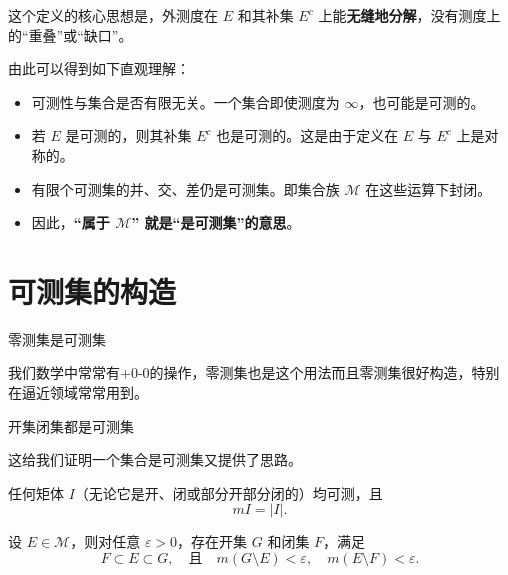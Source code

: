 \documentclass[lang=cn,10pt]{elegantbook}
\begin{document}
这个定义的核心思想是，外测度在 $E$ 和其补集 $E^c$ 上能\textbf{无缝地分解}，没有测度上的“重叠”或“缺口”。

由此可以得到如下直观理解：
\begin{itemize}
  \item 可测性与集合是否有限无关。一个集合即使测度为 $\infty$，也可能是可测的。
  \item 若 $E$ 是可测的，则其补集 $E^c$ 也是可测的。这是由于定义在 $E$ 与 $E^c$ 上是对称的。
  \item 有限个可测集的并、交、差仍是可测集。即集合族 $\mathcal{M}$ 在这些运算下封闭。
  \item 因此，\textbf{“属于 $\mathcal{M}$” 就是“是可测集”的意思}。
\end{itemize}
\section{可测集的构造}
\begin{theorem}
    零测集是可测集
\end{theorem}
我们数学中常常有+0-0的操作，零测集也是这个用法而且零测集很好构造，特别在逼近领域常常用到。
\begin{corollary}
    开集闭集都是可测集
\end{corollary}
这给我们证明一个集合是可测集又提供了思路。
\begin{theorem}
任何矩体 $I$（无论它是开、闭或部分开部分闭的）均可测，且
\[
mI = |I|.
\]
\end{theorem}
\begin{theorem}[可测集可用开集和闭集逼近]
设 $E \in \mathcal{M}$，则对任意 $\varepsilon > 0$，存在开集 $G$ 和闭集 $F$，满足
\[
F \subset E \subset G, \quad \text{且} \quad m(G \setminus E) < \varepsilon, \quad m(E \setminus F) < \varepsilon.
\]
\end{theorem}
\end{document}
